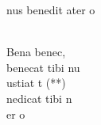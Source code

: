 \documentclass[12pt]{article}
\begin{document}
\begin{multicols*}{2}
\begin{cancion}[Benedicat][]
            nus benedit ater o \\\jump\\
            \begin{chorus}%
            Bena     benec,\\
            benecat tibi nu\\
            ustiat t (**)\\
        \jump
            nedicat tibi n\\
            er o \\
            \end{chorus}%
            \jump\\
        \end{cancion}%
        

\end{multicols*}
\end{document}
